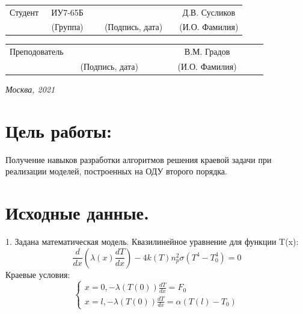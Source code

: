 \documentclass[14pt, a4paper]{extarticle}
\begin{document}
\noindent
{}
\\
\\


\noindent
{}
\\

\vspace{1.5cm}
\noindent
\begin{tabular}{l c c c c c}
	Студент      & ~ИУ7-65Б~               & \hspace{2.5cm} & \hspace{2cm}                 & &  Д.В. Сусликов \\\cline{2-2}\cline{4-4} \cline{6-6} 
	\hspace{3cm} & {\footnotesize(Группа)} &                & {\footnotesize(Подпись, дата)} & & {\footnotesize(И.О. Фамилия)}
\end{tabular}

\noindent
\begin{tabular}{l c c c c}
	Преподователь & \hspace{5cm}   & \hspace{2cm}                 & & ~~~~~~~В.М. Градов~~~~~~~\\\cline{3-3} \cline{5-5} 
	\hspace{3cm}  &                & {\footnotesize(Подпись, дата)} & & {\footnotesize(И.О. Фамилия)}
\end{tabular}

\vspace{0.6cm}
\begin{center}	
	\vfill
	\large \textit {Москва, 2021}
\end{center}

\thispagestyle {empty}
\pagebreak

\clearpage
\section*{Цель работы:} Получение навыков разработки алгоритмов решения краевой задачи при реализации моделей, построенных на ОДУ второго порядка.
\section*{Исходные данные.} 
1. Задана математическая модель. Квазилинейное уравнение для функции T(x):
\begin{equation*}
	\frac{d}{dx} (\lambda(x)\frac{dT}{dx}) - 4k(T)n^{2}_{p}\sigma(T^4 -T^{4}_{0}) = 0
\end{equation*}
Краевые условия:
\begin{equation*}
	\begin{cases}
		x = 0, -\lambda(T(0))\frac{dT}{dx} = F_0\\
		x = l, -\lambda(T(0))\frac{dT}{dx} = \alpha(T(l) - T_0)
	\end{cases}
\end{equation*}
\end{document}
